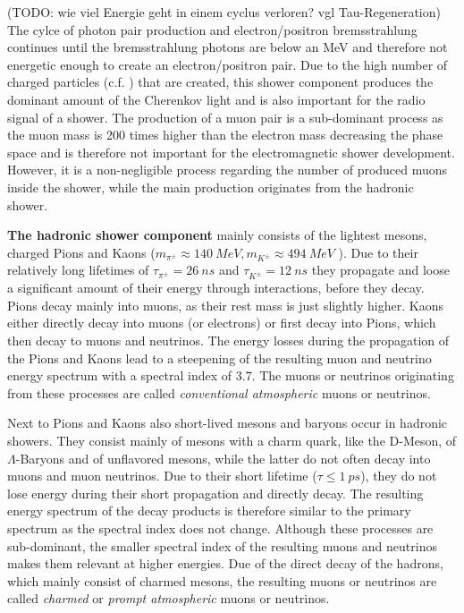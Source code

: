 (TODO: wie viel Energie geht in einem cyclus verloren? vgl Tau-Regeneration)
The cylce of photon pair production and electron/positron bremsstrahlung continues until the bremsstrahlung photons are below an MeV and therefore not energetic enough to create an electron/positron pair.
Due to the high number of charged particles (c.f. ) that are created, this shower component produces the dominant amount of the Cherenkov light and is also important for the radio signal of a shower.
The production of a muon pair is a sub-dominant process as the muon mass is 200 times higher than the electron mass decreasing the phase space and is therefore not important for the electromagnetic shower development.
However, it is a non-negligible process regarding the number of produced muons inside the shower, while the main production originates from the hadronic shower.

\textbf{The hadronic shower component} mainly consists of the lightest mesons, charged Pions and Kaons ($m_{\pi^{\pm}} \approx \SI{140}{MeV}, m_{K^{\pm}} \approx \SI{494}{MeV}$ \cite{PDG20}).
Due to their relatively long lifetimes of $\tau_{\pi^{\pm}} = \SI{26}{ns}$ and $\tau_{K^{\pm}} = \SI{12}{ns}$ they propagate and loose a significant amount of their energy through interactions, before they decay.
Pions decay mainly into muons, as their rest mass is just slightly higher.
Kaons either directly decay into muons (or electrons) or first decay into Pions, which then decay to muons and neutrinos.
The energy losses during the propagation of the Pions and Kaons lead to a steepening of the resulting muon and neutrino energy spectrum with a spectral index of \num{3.7}.
The muons or neutrinos originating from these processes are called \textit{conventional atmospheric} muons or neutrinos.

Next to Pions and Kaons also short-lived mesons and baryons occur in hadronic showers.
They consist mainly of mesons with a charm quark, like the D-Meson, of $\Lambda$-Baryons and of unflavored mesons, while the latter do not often decay into muons and muon neutrinos.
Due to their short lifetime ($\tau \leq \SI{1}{ps}$), they do not lose energy during their short propagation and directly decay.
The resulting energy spectrum of the decay products is therefore similar to the primary spectrum as the spectral index does not change.
Although these processes are sub-dominant, the smaller spectral index of the resulting muons and neutrinos makes them relevant at higher energies.
Due of the direct decay of the hadrons, which mainly consist of charmed mesons, the resulting muons or neutrinos are called \textit{charmed} or \textit{prompt atmospheric} muons or neutrinos.

